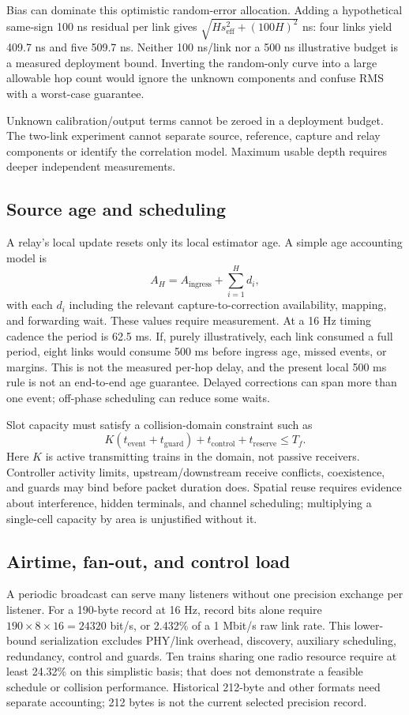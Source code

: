 \documentclass[11pt,letterpaper]{article}
\begin{document}
Bias can dominate this optimistic random-error allocation. Adding a hypothetical same-sign 100 ns residual per link gives $\sqrt{H s_{\mathrm{eff}}^2+(100H)^2}$ ns: four links yield 409.7 ns and five 509.7 ns. Neither 100 ns/link nor a 500 ns illustrative budget is a measured deployment bound. Inverting the random-only curve into a large allowable hop count would ignore the unknown components and confuse RMS with a worst-case guarantee.

Unknown calibration/output terms cannot be zeroed in a deployment budget. The two-link experiment cannot separate source, reference, capture and relay components or identify the correlation model. Maximum usable depth requires deeper independent measurements.

\subsection{Source age and scheduling}
A relay's local update resets only its local estimator age. A simple age accounting model is
\begin{equation}
A_H=A_{\mathrm{ingress}}+\sum_{i=1}^{H}d_i,
\end{equation}
with each $d_i$ including the relevant capture-to-correction availability, mapping, and forwarding wait. These values require measurement. At a 16 Hz timing cadence the period is 62.5 ms. If, purely illustratively, each link consumed a full period, eight links would consume 500 ms before ingress age, missed events, or margins. This is not the measured per-hop delay, and the present local 500 ms rule is not an end-to-end age guarantee. Delayed corrections can span more than one event; off-phase scheduling can reduce some waits.

Slot capacity must satisfy a collision-domain constraint such as
\begin{equation}
K(t_{\mathrm{event}}+t_{\mathrm{guard}})+t_{\mathrm{control}}+t_{\mathrm{reserve}}\leq T_f.
\end{equation}
Here $K$ is active transmitting trains in the domain, not passive receivers. Controller activity limits, upstream/downstream receive conflicts, coexistence, and guards may bind before packet duration does. Spatial reuse requires evidence about interference, hidden terminals, and channel scheduling; multiplying a single-cell capacity by area is unjustified without it.

\subsection{Airtime, fan-out, and control load}
A periodic broadcast can serve many listeners without one precision exchange per listener. For a 190-byte record at 16 Hz, record bits alone require $190\times8\times16=24320$ bit/s, or 2.432\% of a 1 Mbit/s raw link rate. This lower-bound serialization excludes PHY/link overhead, discovery, auxiliary scheduling, redundancy, control and guards. Ten trains sharing one radio resource require at least 24.32\% on this simplistic basis; that does not demonstrate a feasible schedule or collision performance. Historical 212-byte and other formats need separate accounting; 212 bytes is not the current selected precision record.
\end{document}
